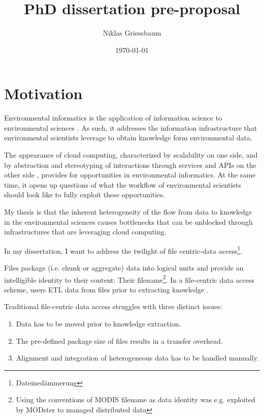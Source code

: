 \documentclass[a4paper,10pt]{article}
\title{PhD dissertation pre-proposal}
\author{Niklas Griessbaum}
\date{\today}
\begin{document}
\maketitle
\printglossaries

\newpage

\section{Motivation}

Environmental informatics is the application of information science to environmental sciences \citep{Frew2012}.
As such, it addresses the information infrastructure that environmental scientists leverage
to obtain knowledge form environmental data.

The appearance of cloud computing, characterized by scalability on one side, 
and by abstraction and stereotyping of interactions through services and \glspl{API} on the other side \citep{Foster2017}, 
provides for opportunities in environmental informatics. 
At the same time, it opens up questions of what the workflow
of environmental scientists should look like to fully exploit these opportunities.

My thesis is that the inherent heterogeneity of the flow from data to knowledge
in the environmental sciences causes bottlenecks that can be unblocked through 
infrastructures that are leveraging cloud computing.

In my dissertation, I want to address the twilight of file centric-data access\footnote{Dateinedämmerung}.

Files package (i.e. chunk or aggregate) data into logical units and provide an intelligible identity to their content: Their filename\footnote{Using the conventions of MODIS  filename as data identity was e.g. exploited by MODster \citep{Frew2005, Frew2002} to managed distributed data}.
In a file-centric data access scheme, users \gls{ETL} data from files prior to extracting knowledge \citep{Rilee2016}.

Traditional file-centric data access struggles with three distinct issues:
\begin{enumerate}
 \item Data has to be moved prior to knowledge extraction.
 \item The pre-defined package size of files results in a transfer overhead.
 \item Alignment and integration of heterogeneous data has to be handled manually.
\end{enumerate}
\end{document}
